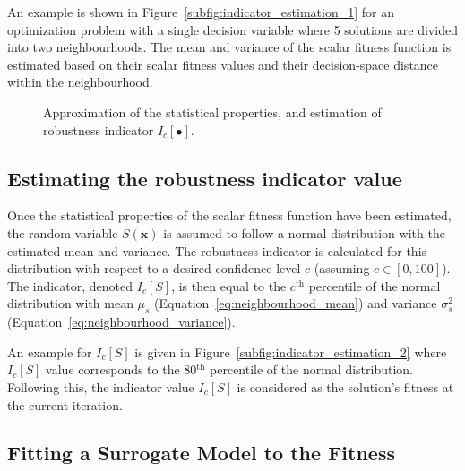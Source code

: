 \documentclass{llncs}
\newcommand{\brr}[1]{{\left({#1}\right)}} %
\newcommand{\Ic}[1]{I_c\!\left[{#1}\right]} %
\newcommand{\vx}{\mathbf{x}} %
\begin{document}
An example is shown in Figure~\ref{subfig:indicator_estimation_1} for an optimization problem with a single decision variable where 5 solutions are divided into two neighbourhoods. The mean and variance of the scalar fitness function is estimated based on their scalar fitness values and their decision-space distance within the neighbourhood.

\begin{figure}
\centering
{}
\hspace{1mm}
\caption{Approximation of the statistical properties, and estimation of robustness indicator $\Ic{\bullet}$.}
\label{fig:indicator_estimation}
\end{figure}

\subsection{Estimating the robustness indicator value}\label{subsec:robustness_indicators}

Once the statistical properties of the scalar fitness function have been estimated, the random variable $S\brr{\vx}$ is assumed to follow a normal distribution with the estimated mean and variance. The robustness indicator is calculated for this distribution with respect to a desired confidence level $c$ (assuming $c\in[0,100]$). The indicator, denoted $\Ic{S}$, is then equal to the $c^\textrm{th}$ percentile of the normal distribution with mean $\mu_s$ (Equation~\ref{eq:neighbourhood_mean}) and variance $\sigma_s^2$ (Equation~\ref{eq:neighbourhood_variance}).

An example for $\Ic{S}$ is given in Figure~\ref{subfig:indicator_estimation_2} where $\Ic{S}$ value corresponds to the 80$^\textrm{th}$ percentile of the normal distribution. Following this, the indicator value $\Ic{S}$ is considered as the solution's fitness at the current iteration.


\subsection{Fitting a Surrogate Model to the Fitness}\label{subsec:Kriging}
\end{document}
